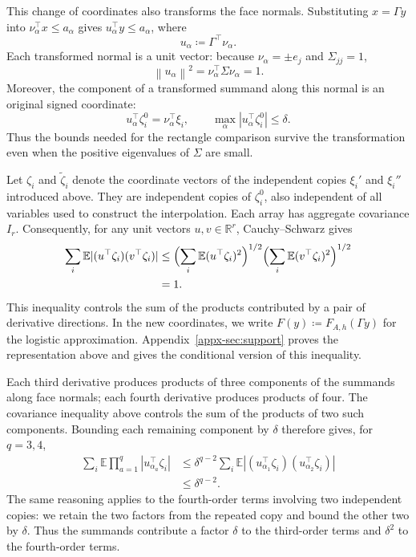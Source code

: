 \documentclass[11pt,letterpaper]{article}
\theoremstyle{remark}
\newcommand{\E}{\mathbb E}
\newcommand{\R}{\mathbb R}
\newcommand{\norm}[1]{\left\lVert#1\right\rVert}
\begin{document}
This change of coordinates also transforms the face normals.
Substituting \(x=\Gamma y\) into \(\nu_\alpha^\top x\le a_\alpha\)
gives \(u_\alpha^\top y\le a_\alpha\), where
\[
 u_\alpha\coloneqq\Gamma^\top\nu_\alpha.
\]
Each transformed normal is a unit vector: because \(\nu_\alpha=\pm e_j\)
and \(\Sigma_{jj}=1\),
\[
 \norm{u_\alpha}^2=\nu_\alpha^\top\Sigma\nu_\alpha=1.
\]
Moreover, the component of a transformed summand along this normal is
an original signed coordinate:
\[
 u_\alpha^\top\zeta_i^0=\nu_\alpha^\top\xi_i,\qquad
 \max_\alpha|u_\alpha^\top\zeta_i^0|\le\delta.
\]
Thus the bounds needed for the rectangle comparison survive the
transformation even when the positive eigenvalues of \(\Sigma\) are small.

Let \(\zeta_i\) and \(\widetilde\zeta_i\) denote the coordinate
vectors of the independent copies \(\xi_i'\) and \(\xi_i''\)
introduced above. They are independent copies of \(\zeta_i^0\),
also independent of all variables used to construct the interpolation.
Each array has aggregate covariance \(I_r\). Consequently, for any
unit vectors \(u,v\in\R^r\),
Cauchy--Schwarz gives
\[
 \begin{aligned}
 \sum_i\E|(u^\top\zeta_i)(v^\top\zeta_i)|
 &\le\Bigl(\sum_i\E(u^\top\zeta_i)^2\Bigr)^{1/2}
       \Bigl(\sum_i\E(v^\top\zeta_i)^2\Bigr)^{1/2}\\
 &=1.
 \end{aligned}
\]
This inequality controls the sum of the products contributed by a pair
of derivative directions. In the new coordinates, we write
\(F(y)\coloneqq F_{A,h}(\Gamma y)\) for the logistic approximation.
Appendix~\ref{appx-sec:support} proves the representation above and gives
the conditional version of this inequality.

Each third derivative produces products of three components of the
summands along face normals; each fourth derivative produces products
of four. The covariance inequality above controls the sum of the
products of two such components. Bounding each remaining component
by \(\delta\) therefore gives, for \(q=3,4\),
\[
 \begin{aligned}
 \sum_i\E\prod_{a=1}^{q}|u_{\alpha_a}^{\top}\zeta_i|
 &\le\delta^{q-2}\sum_i\E
     |(u_{\alpha_1}^{\top}\zeta_i)(u_{\alpha_2}^{\top}\zeta_i)|\\
 &\le\delta^{q-2}.
 \end{aligned}
\]
The same reasoning applies to the fourth-order terms involving two
independent copies: we retain the two factors from the repeated copy
and bound the other two by \(\delta\). Thus the summands contribute a
factor \(\delta\) to the third-order terms and \(\delta^2\) to the
fourth-order terms.
\end{document}
